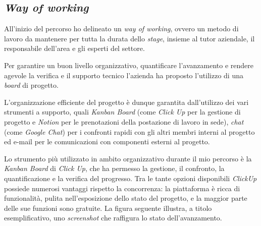 \subsection{\textit{Way of working}}

All'inizio del percorso ho delineato un \textit{way of working}, ovvero un metodo di lavoro da mantenere per tutta la durata dello \textit{stage}, insieme al tutor aziendale, il responsabile dell'area  e gli esperti del settore.

Per garantire un buon livello organizzativo, quantificare l'avanzamento e rendere agevole la verifica e il supporto tecnico l'azienda ha proposto l'utilizzo di una \textit{board} di progetto.

L'organizzazione efficiente del progetto è dunque garantita dall'utilizzo dei vari strumenti a supporto, quali \textit{Kanban Board} (come \textit{Click Up} per la gestione di progetto e \textit{Notion} per le prenotazioni della postazione di lavoro in sede), \textit{chat} (come \textit{Google Chat}) per i confronti rapidi con gli altri membri interni al progetto ed e-mail per le comunicazioni con componenti esterni al progetto.

Lo strumento più utilizzato in ambito organizzativo durante il mio percorso è la \textit{Kanban Board} di \textit{Click Up}, che ha permesso la gestione, il confronto, la quantificazione e la verifica del progresso.
Tra le tante opzioni disponibili \textit{ClickUp} possiede numerosi vantaggi rispetto la concorrenza: la piattaforma è ricca di funzionalità, pulita nell'esposizione dello stato del progetto, e la maggior parte delle sue funzioni sono gratuite.
La figura seguente illustra, a titolo esemplificativo, uno \textit{screenshot} che raffigura lo stato dell'avanzamento.

